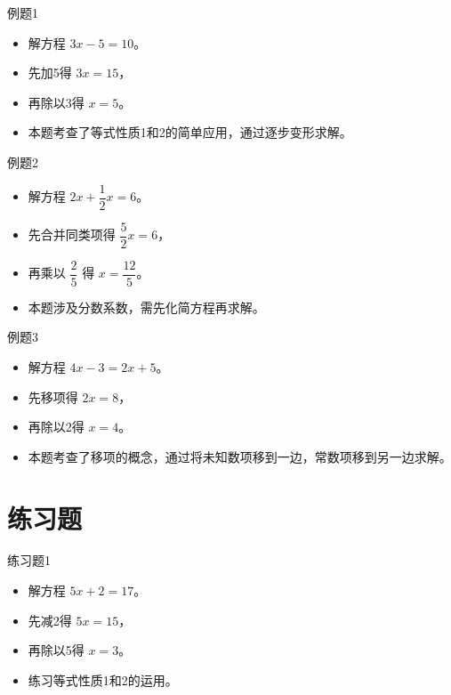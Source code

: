 \documentclass{ctexbeamer}
\begin{document}
\begin{frame}{例题1}
  \begin{itemize}
    \item 解方程 $3x - 5 = 10$。
    \item 先加5得 $3x = 15$，
    \item 再除以3得 $x = 5$。
    \item 本题考查了等式性质1和2的简单应用，通过逐步变形求解。
  \end{itemize}
\end{frame}

\begin{frame}{例题2}
  \begin{itemize}
    \item 解方程 \(2x + \dfrac{1}{2}x = 6\)。
    \item 先合并同类项得 \(\dfrac{5}{2}x = 6\)，
    \item 再乘以 \(\dfrac{2}{5}\) 得 \(x = \dfrac{12}{5}\)。
    \item 本题涉及分数系数，需先化简方程再求解。
  \end{itemize}
\end{frame}

\begin{frame}{例题3}
  \begin{itemize}
    \item 解方程 \(4x - 3 = 2x + 5\)。
    \item 先移项得 \(2x = 8\)，
    \item 再除以2得 \(x = 4\)。
    \item 本题考查了移项的概念，通过将未知数项移到一边，常数项移到另一边求解。
  \end{itemize}
\end{frame}

\section{练习题}

\begin{frame}{练习题1}
  \begin{itemize}
    \item 解方程 \(5x + 2 = 17\)。
    \item 先减2得 \(5x = 15\)，
    \item 再除以5得 \(x = 3\)。
    \item 练习等式性质1和2的运用。
  \end{itemize}
\end{frame}
\end{document}
